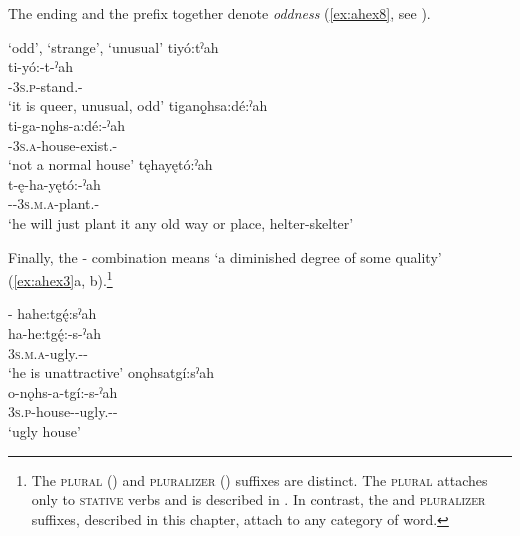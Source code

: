 The  {\diminutive} ending and the  \textsc{\contrastive} prefix together denote \emph{oddness} (\ref{ex:ahex8}, see ).

\newpage
\ea\label{ex:ahex8}  ‘odd’, ‘strange’, ‘unusual’
\ea tiyó:tˀah\\
\gll ti-yó:-t-ˀah\\
 {\contrastive}-\textsc{3s.p}-stand.{\stative}-{\diminutive}\\
\glt `it is queer, unusual, odd'
\ex tiganǫ̱hsa:dé:ˀah\\
\gll ti-ga-nǫ̱hs-a:dé:-ˀah\\
 {\contrastive}-\textsc{3s.a}-house-exist.{\stative}-{\diminutive}\\
\glt `not a normal house'
\ex tęhayętó:ˀah\\
\gll t-ę-ha-yętó:-ˀah\\
 {\contrastive}-{\future}-\textsc{3s.m.a}-plant.{\punctual}-{\diminutive}\\
\glt `he will just plant it any old way or place, helter-skelter'
\z
\z

Finally, the  \textsc{\plural-\diminutive} combination means `a diminished degree of some quality' (\ref{ex:ahex3}a, b).\footnote{The \textsc{plural} ({\plural}) and \textsc{pluralizer} ({\pluralizer}) suffixes are distinct. The  \textsc{plural} attaches only to \textsc{stative} verbs and is described in . In contrast, the  and  \textsc{pluralizer} suffixes, described in this chapter, attach to any category of word.}

\ea\label{ex:ahex3}  \textsc{\plural-\diminutive}
\ea hahe:tgę́:sˀah\\\label{ex:ahex3a}
\gll ha-he:tgę́:-s-ˀah\\
 \textsc{3s.m.a}-ugly.{\stative}-{\plural}-\exsc{\diminutive}\\
\glt `he is unattractive'
\ex onǫhsatgí:sˀah\\\label{ex:ahex3b}
\gll o-nǫhs-a-tgí:-s-ˀah\\
 \textsc{3s.p}-house-{\joinerA}-ugly.{\stative}-{\plural}-\exsc{\diminutive}\\
\glt `ugly house'
\z
\z


